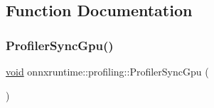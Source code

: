 \subsection{Function Documentation}
\mbox{\label{namespaceonnxruntime_1_1profiling_aae85e4bd42cbc94f71a4e1891834b17f}} 
\subsubsection{\texorpdfstring{Profiler\+Sync\+Gpu()}{ProfilerSyncGpu()}}
{\footnotesize\ttfamily \mbox{\hyperlink{mlasi_8h_a88f941d423cb2a819b70a1358982b1a6}{void}} onnxruntime\+::profiling\+::\+Profiler\+Sync\+Gpu (\begin{DoxyParamCaption}{ }\end{DoxyParamCaption})}


